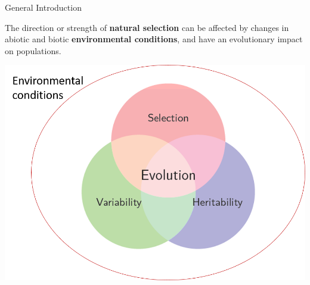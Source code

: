 \documentclass[compress]{beamer}
\begin{document}
\begin{frame}{General Introduction}

 
The direction or strength of \textbf{natural selection} can be affected by changes in abiotic and biotic \textbf{environmental conditions}, and  have an evolutionary impact on populations.

\vspace{0.5cm}\centering
 \includegraphics[height = 6 cm]{Image/Illustration/env condition.png} \\




\end{frame}
\end{document}
